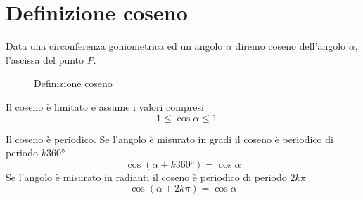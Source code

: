 \section{Definizione coseno}\label{sec:definizione-coseno}
\begin{defn}[Coseno]\label{defn:coseno1}
Data una circonferenza goniometrica ed un angolo $\alpha$ diremo coseno dell'angolo $\alpha$, l'ascissa del punto $P$.
\end{defn}
\begin{figure}
	\centering
	
	\caption{Definizione coseno}
	\label{fig:cosenodefinizione}
\end{figure}
%	
\begin{prop}\label{prop:Cosenolimitato}
Il coseno è limitato
e assume i valori compresi
\begin{equation*}
-1\leq \cos\alpha \leq 1
\end{equation*}
\end{prop}
\begin{prop}\label{Prop:periodocoseno}
Il coseno è periodico. 
Se l'angolo è misurato in gradi il coseno è periodico di periodo $k\ang{360}$
\begin{equation*}
\cos(\alpha+k\ang{360;;})=\cos\alpha
\end{equation*}
Se l'angolo è misurato in radianti il coseno è periodico di periodo $2k\pi$
\begin{equation*}
\cos(\alpha+2k\pi)=\cos\alpha
\end{equation*}
\end{prop}
